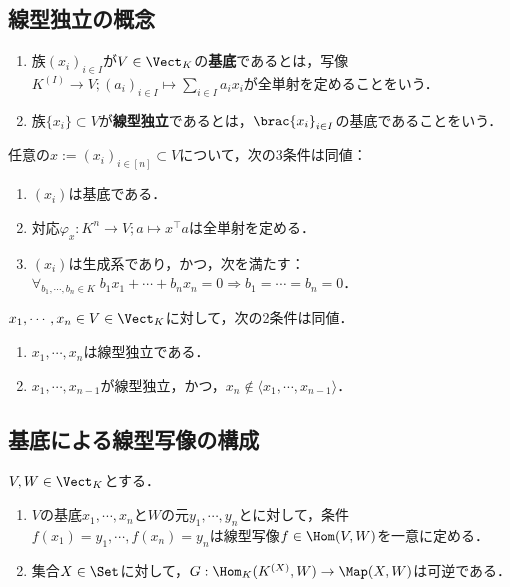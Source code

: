 \documentclass[uplatex, dvipdfmx]{jsreport}
\begin{document}
\subsection{線型独立の概念}

\begin{definition}\mbox{}
    \begin{enumerate}
        \item 族$(x_i)_{i\in I}$が$V\in\Vect_K$の\textbf{基底}であるとは，写像$K^{(I)}\to V;(a_i)_{i\in I}\mapsto\sum_{i\in I}a_ix_i$が全単射を定めることをいう．
        \item 族$\{x_i\}\subset V$が\textbf{線型独立}であるとは，$\brac{x_i}_{i\in I}$の基底であることをいう．
    \end{enumerate}
\end{definition}

\begin{proposition}[基底の特徴付け]
    任意の$x:=(x_i)_{i\in[n]}\subset V$について，次の3条件は同値：
    \begin{enumerate}
        \item $(x_i)$は基底である．
        \item 対応$\varphi_x:K^n\to V;a\mapsto x^\top a$は全単射を定める．
        \item $(x_i)$は生成系であり，かつ，次を満たす：$\forall_{b_1,\cdots,b_n\in K}\;b_1x_1+\cdots+b_nx_n=0\Rightarrow b_1=\cdots=b_n=0$．
    \end{enumerate}
\end{proposition}

\begin{proposition}\label{prop-linear-system-expansion}
    $x_1,\cdots,x_n\in V\in\Vect_K$に対して，次の2条件は同値．
    \begin{enumerate}
        \item $x_1,\cdots,x_n$は線型独立である．
        \item $x_1,\cdots,x_{n-1}$が線型独立，かつ，$x_n\notin\langle x_1,\cdots,x_{n-1}\rangle$．
    \end{enumerate}
\end{proposition}

\subsection{基底による線型写像の構成}

\begin{proposition}\label{prop-linear-map-via-basis}
    $V,W\in\Vect_K$とする．
    \begin{enumerate}
        \item $V$の基底$x_1,\cdots,x_n$と$W$の元$y_1,\cdots,y_n$とに対して，条件$f(x_1)=y_1,\cdots,f(x_n)=y_n$は線型写像$f\in\Hom(V,W)$を一意に定める．
        \item 集合$X\in\Set$に対して，$G:\Hom_K(K^{(X)},W)\to\Map(X,W)$は可逆である．
    \end{enumerate}
\end{proposition}
\end{document}
